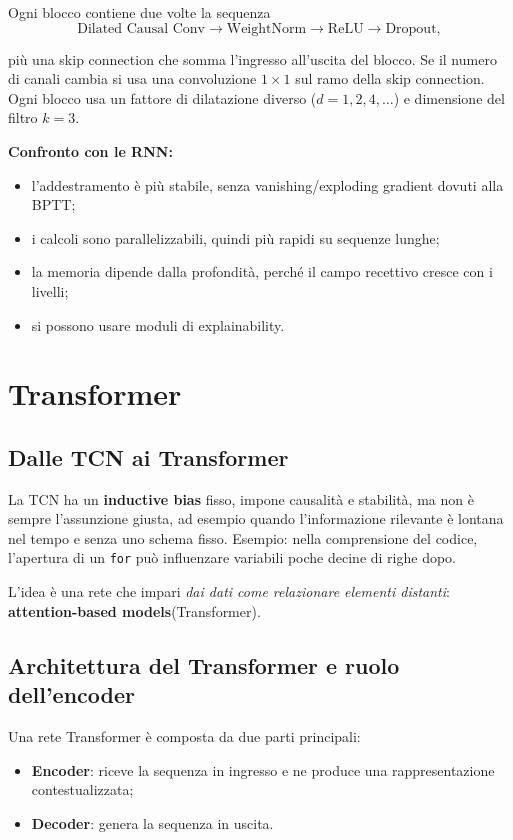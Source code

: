 \documentclass[11pt,a4paper]{article}
\begin{document}
Ogni blocco contiene due volte la sequenza
\[
\text{Dilated Causal Conv} \rightarrow \text{WeightNorm} \rightarrow \text{ReLU} \rightarrow \text{Dropout},
\]

più una skip connection che somma l'ingresso all'uscita del blocco. Se il numero di canali cambia si usa una convoluzione 
$1\times 1$ sul ramo della skip connection. Ogni blocco usa un fattore di dilatazione diverso ($d=1,2,4,\dots$) e 
dimensione del filtro $k=3$.


\textbf{Confronto con le RNN:}
\begin{itemize}
    \item l'addestramento è più stabile, senza vanishing/exploding gradient dovuti alla BPTT;
    \item i calcoli sono parallelizzabili, quindi più rapidi su sequenze lunghe;
    \item la memoria dipende dalla profondità, perché il campo recettivo cresce con i livelli;
    \item si possono usare moduli di explainability.
\end{itemize}


\section{Transformer}

\subsection{Dalle TCN ai Transformer}

La TCN ha un \textbf{inductive bias} fisso, impone causalità e stabilità, ma non è sempre l'assunzione giusta,
 ad esempio quando l'informazione rilevante è lontana nel tempo e senza uno schema fisso. Esempio: 
 nella comprensione del codice, l'apertura di un \texttt{for} può influenzare variabili poche decine di righe dopo.

L'idea è una rete che impari \textit{dai dati come relazionare elementi distanti}:
\textbf{attention-based models}(Transformer).

\subsection{Architettura del Transformer e ruolo dell'encoder}

Una rete Transformer è composta da due parti principali:
\begin{itemize}
    \item \textbf{Encoder}: riceve la sequenza in ingresso e ne produce una rappresentazione contestualizzata;
    \item \textbf{Decoder}: genera la sequenza in uscita.
\end{itemize}
\end{document}
